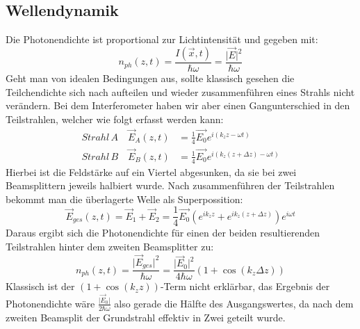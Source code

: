 \documentclass{include/thesisclass3}
\begin{document}
\subsection{Wellendynamik}
Die Photonendichte ist proportional zur Lichtintensität und gegeben mit:
\begin{equation}
n_{ph}(z,t)=\frac{I(\vec{x},t)}{\hbar \omega}=\frac{\vert \vec{E}\vert ^2}{\hbar \omega}
\end{equation}
Geht man von idealen Bedingungen aus, sollte klassisch gesehen die Teilchendichte sich nach aufteilen und wieder zusammenführen eines Strahls nicht verändern. Bei dem Interferometer haben wir aber einen Gangunterschied in den Teilstrahlen, welcher wie folgt erfasst werden kann:
\begin{align}
\si{Strahl\, A}\quad \vec{E}_A(z,t)&=\frac{1}{4}\vec{E_0}e^{i(k_z z-\omega t)}\\
\si{Strahl\, B}\quad \vec{E}_B(z,t)&=\frac{1}{4}\vec{E_0}e^{i(k_z (z+\Delta z)-\omega t)}
\end{align}
Hierbei ist die Feldstärke auf ein Viertel abgesunken, da sie bei zwei Beamsplittern jeweils halbiert wurde. Nach zusammenführen der Teilstrahlen bekommt man die überlagerte Welle als Superpossition:
\begin{equation}
\vec{E}_{ges}(z,t)= \vec{E}_1+\vec{E}_2=\frac{1}{4}\vec{E_0}(e^{ik_z z}+e^{ik_z (z+\Delta z)})e^{i\omega t}
\end{equation}
Daraus ergibt sich die Photonendichte für einen der beiden resultierenden Teilstrahlen hinter dem zweiten Beamsplitter zu:
\begin{equation}
n_{ph}(z,t)=\frac{\vert \vec{E}_{ges} \vert ^2}{\hbar \omega}=\frac{\vert \vec{E}_0\vert ^2}{4\hbar\omega}(1+\cos(k_z\Delta z))\label{n}
\end{equation}
Klassisch ist der $(1+\cos(k_z z))$-Term nicht erklärbar, das Ergebnis der Photonendichte wäre $\frac{\vert \vec{E}_0\vert}{2\hbar \omega}$ also gerade die Hälfte des Ausgangswertes, da nach dem zweiten Beamsplit der Grundstrahl effektiv in Zwei geteilt wurde. 
\end{document}
